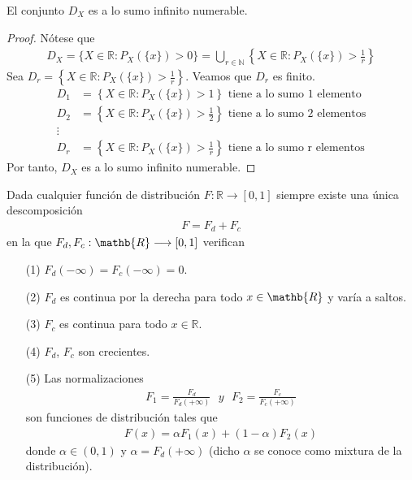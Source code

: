 \begin{teo}
El conjunto $D_X$ es a lo sumo infinito numerable.
\end{teo}

\begin{proof}
Nótese que
\begin{align*}
    D_X = \{ X \in \mathbb{R} : P_X(\{x\}) > 0 \} = \bigcup_{r \in \mathbb{N}}{\left\{ X \in \mathbb{R} : P_X(\{x\}) > \frac{1}{r} \right\}}
\end{align*}
Sea $D_r = \left\{ X \in \mathbb{R} : P_X(\{x\}) > \frac{1}{r} \right\}$. Veamos que $D_r$ es finito.
\begin{align*}
    D_1 &= \left\{ X \in \mathbb{R} : P_X(\{x\}) > 1 \right\} \text{ tiene a lo sumo 1 elemento}\\
    D_2 &= \left\{ X \in \mathbb{R} : P_X(\{x\}) > \frac{1}{2} \right\} \text{ tiene a lo sumo 2 elementos}\\
    \vdots &  \\
    D_r &= \left\{ X \in \mathbb{R} : P_X(\{x\}) > \frac{1}{r} \right\} \text{ tiene a lo sumo r elementos}
\end{align*}
Por tanto, $D_X$ es a lo sumo infinito numerable.
\end{proof}

\begin{teo}
Dada cualquier función de distribución $F: \mathbb{R} \longrightarrow [0,1]$ siempre existe una única descomposición
\begin{align*}
    F = F_d + F_c
\end{align*}
en la que $F_d,F_c: \mathb{R} \longrightarrow [0,1]$ verifican
\begin{enumerate}
    \item[(1)] $F_d(-\infty) = F_c(-\infty) = 0$.
    \item[(2)] $F_d$ es continua por la derecha para todo $x \in \mathb{R}$ y varía a saltos.
    \item[(3)] $F_c$ es continua para todo $x \in \mathbb{R}$.
    \item[(4)] $F_d$, $F_c$ son crecientes.
    \item[(5)] Las normalizaciones
    \begin{align*}
        F_1 = \frac{F_d}{F_d(+\infty)} \ \ \ y \ \ \ F_2 = \frac{F_c}{F_c(+\infty)}
    \end{align*}
    son funciones de distribución tales que
    \begin{align*}
        F(x) = \alpha F_1(x) + (1 - \alpha)F_2(x)
    \end{align*}
    donde $\alpha \in (0,1)$ y $\alpha = F_d(+\infty)$ (dicho $\alpha$ se conoce como mixtura de la distribución).
\end{enumerate}
\end{teo}
